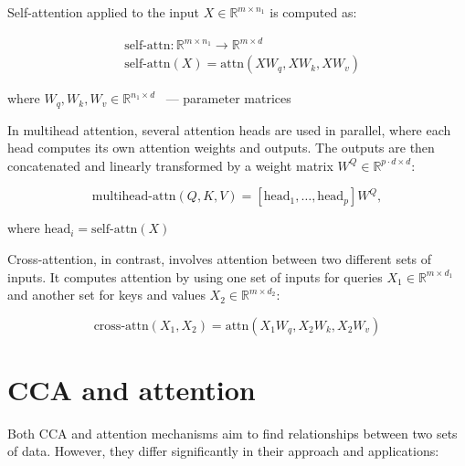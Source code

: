 \documentclass[a4paper,14pt]{article}
\newcommand{\dR}{\mathbb{R}}
\theoremstyle{plain} %
\theoremstyle{definition} %
\theoremstyle{remark} %
\begin{document}
	Self-attention applied to the input $X \in \dR^{m \times n_1}$ is computed as:
	
	\begin{equation}
		\begin{aligned}
			&\text{self-attn}: \mathbb{R}^{m \times n_1} \longrightarrow \mathbb{R}^{m \times d} \\
			&\text{self-attn}(X) = \text{attn}(X W_q, X W_k, X W_v)
		\end{aligned}
		\label{self-attn}
	\end{equation}

	
	where $W_q, W_k, W_v \in \dR^{n_1 \times d}$ ~--- parameter matrices
	
	
	In multihead attention, several attention heads are used in parallel, where each head computes its own attention weights and outputs. The outputs are then concatenated and linearly transformed by a weight matrix $W^Q \in \dR^{p \cdot d \times d}$:
	
	\begin{equation}
		\text{multihead-attn}(Q, K, V) = [\text{head}_1, \ldots, \text{head}_p] W^Q,
		\label{multihead-attn}
	\end{equation}
	
	where $\text{head}_i = \text{self-attn}(X)$
	
	Cross-attention, in contrast, involves attention between two different sets of inputs. It computes attention by using one set of inputs for queries $X_1 \in \dR^{m \times d_1}$ and another set for keys and values $X_2 \in \dR^{m \times d_2}$:
	
	\begin{equation}
		\text{cross-attn}(X_1, X_2) = \text{attn}(X_1 W_q, X_2 W_k, X_2 W_v) \label{cross-attn}
	\end{equation}
	
	\section*{CCA and attention}
	
	Both CCA and attention mechanisms aim to find relationships between two sets of data. However, they differ significantly in their approach and applications:
	
	\setlength{\extrarowheight}{3mm}
	
\end{document}
